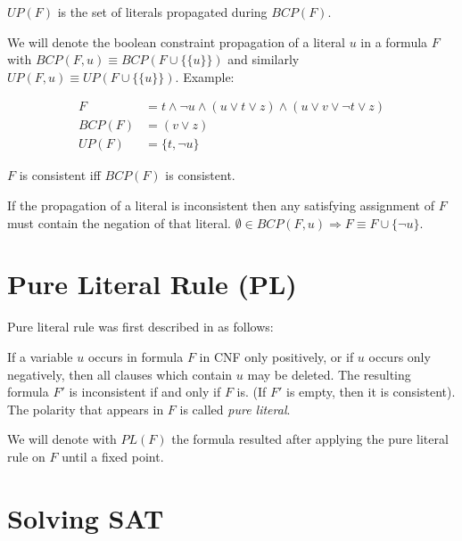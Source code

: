 \begin{mydef}
$UP(F)$ is the set of literals propagated during $BCP(F)$.
\end{mydef}

We will denote the boolean constraint propagation of a literal $u$ in a
formula $F$ with $BCP(F, u) \equiv BCP(F \cup \{\{ u \}\})$
and similarly $UP(F, u) \equiv UP(F \cup \{\{ u \}\})$. Example:

\begin{align}
  F &= t \land \neg u \land (u \lor t \lor z) \land (u \lor v \lor \neg t \lor z) \\
  BCP(F) &= (v \lor z) \\
  UP(F) &= \{ t, \neg u \}
\end{align}

\begin{myprop}
  $F$ is consistent iff $BCP(F)$ is consistent.
\end{myprop}

\begin{myprop}
  If the propagation of a literal is inconsistent then any satisfying
  assignment of $F$ must contain the negation of that literal.
  $\emptyset \in BCP(F, u) \Rightarrow F \equiv F \cup \{\neg u\}$.
\end{myprop}


\section{Pure Literal Rule (PL)}
\label{sec:pl}

Pure literal rule was first described in \cite{Davis:1960:CPQ:321033.321034}
as follows:

\begin{mydef}
  If a variable $u$ occurs in formula $F$ in CNF only positively, or
  if $u$ occurs only negatively, then all clauses which contain $u$
  may be deleted. The resulting formula $F'$ is inconsistent
  if and only if $F$ is. (If $F'$ is empty, then it is consistent).
  The polarity that appears in $F$ is called \emph{pure literal}.
\end{mydef}

We will denote with $PL(F)$ the formula resulted after applying
the pure literal rule on $F$ until a fixed point.


\section{Solving SAT}


